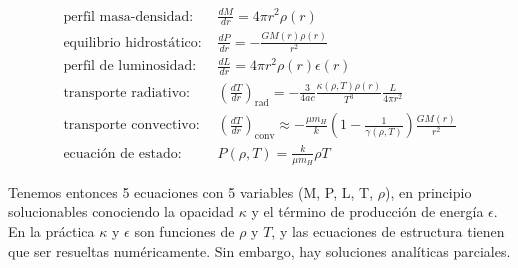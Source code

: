 \documentclass[11pt,letterpaper]{article}
\begin{document}
\begin{align}
    \text{perfil masa-densidad: } & \frac{dM}{dr} = 4\pi r^2 \rho(r) \\
    \text{equilibrio hidrostático: } & \frac{dP}{dr} = -\frac{GM(r)\rho(r)}{r^2} \\
    \text{perfil de luminosidad: } & \frac{dL}{dr} = 4\pi r^2 \rho(r) \epsilon(r) \\
    \text{transporte radiativo: } & \left( \frac{dT}{dr} \right)_{\text{rad}} = -\frac{3}{4ac} \frac{\kappa(\rho, T)\rho(r)}{T^3} \frac{L}{4\pi r^2} \\
    \text{transporte convectivo: } & \left( \frac{dT}{dr} \right)_{\text{conv}} \approx -\frac{\mu m_H}{k} \left( 1 - \frac{1}{\gamma(\rho, T)} \right) \frac{GM(r)}{r^2} \\
    \text{ecuación de estado: } & P(\rho, T) = \frac{k}{\mu m_H} \rho T
\end{align}

Tenemos entonces 5 ecuaciones con 5 variables (M, P, L, T, \(\rho\)), en principio solucionables conociendo la opacidad \(\kappa\) y el término de producción de energía \(\epsilon\). En la práctica \(\kappa\) y \(\epsilon\) son funciones de \(\rho\) y \(T\), y las ecuaciones de estructura tienen que ser resueltas numéricamente. Sin embargo, hay soluciones analíticas parciales.
\end{document}
